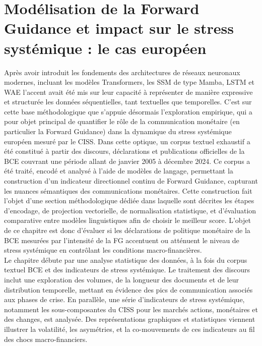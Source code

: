 \chapter{Modélisation de la Forward Guidance et impact sur le stress systémique : le cas européen}
\minitoc

Après avoir introduit les fondements des architectures de réseaux neuronaux modernes, incluant les modèles Transformers, les SSM de type Mamba, LSTM et WAE l’accent avait été mis sur leur capacité à représenter de manière expressive et structurée les données séquentielles, tant textuelles que temporelles. C’est sur cette base méthodologique que s’appuie désormais l’exploration empirique, qui a pour objet principal de quantifier le rôle de la communication monétaire (en particulier la Forward Guidance) dans la dynamique du stress systémique européen mesuré par le CISS. Dans cette optique, un corpus textuel exhaustif a été constitué à partir des discours, déclarations et publications officielles de la BCE couvrant une période allant de janvier 2005 à décembre 2024. Ce corpus a été traité, encodé et analysé à l’aide de modèles de langage, permettant la construction d’un indicateur directionnel continu de Forward Guidance, capturant les nuances sémantiques des communications monétaires. Cette construction fait l’objet d’une section méthodologique dédiée dans laquelle sont décrites les étapes d’encodage, de projection vectorielle, de normalisation statistique, et d’évaluation comparative entre modèles linguistiques afin de choisir le meilleur score. L'objet de ce chapitre est donc d'évaluer si les déclarations de politique monétaire de la BCE 
mesurées par l'intensité de la FG accentuent ou atténuent le niveau de stress systémique en contrôlant les conditions macro-financières.\\

Le chapitre débute par une analyse statistique des données, à la fois du corpus textuel BCE et des indicateurs de stress systémique. Le traitement des discours inclut une exploration des volumes, de la longueur des documents et de leur distribution temporelle, mettant en évidence des pics de communication associés aux phases de crise. En parallèle, une série d’indicateurs de stress systémique, notamment les sous-composantes du CISS pour les marchés actions, monétaires et des changes, est analysée.
Des représentations graphiques et statistiques viennent illustrer la volatilité, les asymétries, et la co-mouvements de ces indicateurs au fil des chocs macro-financiers.\\

